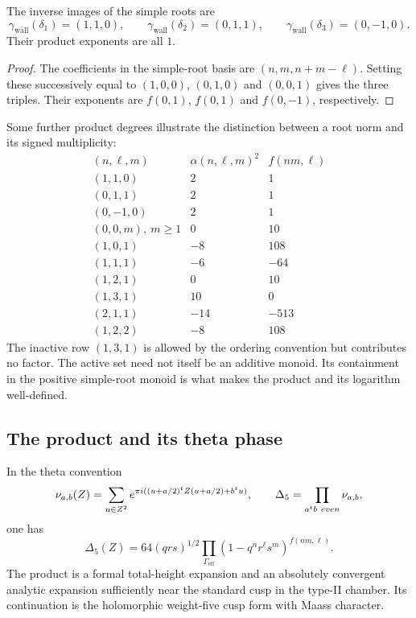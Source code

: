 \begin{proposition}
\label{prop:type-ii-wall-images}
The inverse images of the simple roots are
\[
 \gamma_{\mathrm{wall}}(\delta_1)=(1,1,0),\qquad
 \gamma_{\mathrm{wall}}(\delta_2)=(0,1,1),\qquad
 \gamma_{\mathrm{wall}}(\delta_3)=(0,-1,0).
\]
Their product exponents are all \(1\).
\end{proposition}

\begin{proof}
The coefficients in the simple-root basis are
\((n,m,n+m-\ell)\).
Setting these successively equal to \((1,0,0)\), \((0,1,0)\)
and \((0,0,1)\) gives the three triples.
Their exponents are \(f(0,1)\), \(f(0,1)\) and \(f(0,-1)\),
respectively.
\end{proof}

Some further product degrees illustrate the distinction between a
root norm and its signed multiplicity:
\[
\begin{array}{c|r|r}
 (n,\ell,m)&\alpha(n,\ell,m)^2&f(nm,\ell)\\ \hline
 (1,1,0)&2&1\\
 (0,1,1)&2&1\\
 (0,-1,0)&2&1\\
 (0,0,m),\ m\geq1&0&10\\
 (1,0,1)&-8&108\\
 (1,1,1)&-6&-64\\
 (1,2,1)&0&10\\
 (1,3,1)&10&0\\
 (2,1,1)&-14&-513\\
 (1,2,2)&-8&108
\end{array}
\]
The inactive row \((1,3,1)\) is allowed by the ordering
convention but contributes no factor.
The active set need not itself be an additive monoid.
Its containment in the positive simple-root monoid is what makes
the product and its logarithm well-defined.

\subsection{The product and its theta phase}

\begin{theorem}
\label{thm:borcherds-product-delta5}
In the theta convention
\[
 \nu_{a,b}(Z)=
 \sum_{u\in Z^2}e^{\pi i((u+a/2)^tZ(u+a/2)+b^tu)},\qquad
 \Delta_5=\prod_{a^tb\ even}\nu_{a,b},
\]
one has
\[
 \Delta_5(Z)
 =64(qrs)^{1/2}
 \prod_{\Gamma_{\mathrm{eff}}}
                (1-q^nr^\ell s^m)^{f(nm,\ell)}.
\]
The product is a formal total-height expansion and an absolutely
convergent analytic expansion sufficiently near the standard cusp in
the type-II chamber.  Its continuation is the holomorphic
weight-five cusp form with Maass character.
\end{theorem}

